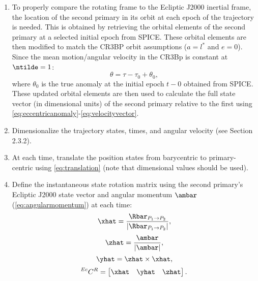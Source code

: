 \begin{enumerate}
    \item   To properly compare the rotating frame to the Ecliptic J2000 inertial frame, the
            location of the second primary in its orbit at each epoch of the trajectory is needed.
            This is obtained by retrieving the orbital elements of the second primary at a selected
            initial epoch from SPICE\cite{Semenov:2023}. These orbital elements are then modified
            to match the CR3BP orbit assumptions ($a=l^{*}$ and $e=0$). Since the mean
            motion/angular velocity in the CR3Bp is constant at $\ntilde=1$:
            \begin{equation}
                \theta=\tau-\tau_{0}+\theta_{0},
                \label{eq:instantaneoustrueanomaly}
            \end{equation}
            where $\theta_{0}$ is the true anomaly at the initial epoch $t-{0}$ obtained from
            SPICE. These updated orbital elements are then used to calculate the full state vector
            (in dimensional units) of the second primary relative to the first using
            \cref{eq:eccentricanomaly}-\cref{eq:velocityvector}.
    \item   Dimensionalize the trajectory states, times, and angular velocity (see Section 2.3.2).
    \item   At each time, translate the position states from barycentric to primary-centric using
            \cref{eq:translation} (note that dimensional values should be used).
    \item   Define the instantaneous state rotation matrix using the second primary's Ecliptic
            J2000 state vector and angular momentum $\ambar$ (\cref{eq:angularmomentum}) at each
            time:
            \begin{equation}
                \xhat=\frac{\Rbar_{P_{1}\rightarrow P_{2}}}{|\Rbar_{P_{1}\rightarrow P_{2}}|},
                \label{eq:xhat}
            \end{equation}
            \begin{equation}
                \zhat=\frac{\ambar}{|\ambar|},
                \label{eq:zhat}
            \end{equation}
            \begin{equation}
                \yhat=\zhat\times\xhat,
                \label{eq:yhat}
            \end{equation}
            \begin{equation}
                \prescript{Ec}{}{C}^{R}=\begin{bmatrix} \xhat   &   \yhat   &   \zhat   \end{bmatrix}.
                \label{eq:eclipticpositionrotation}
            \end{equation}


\end{enumerate}
